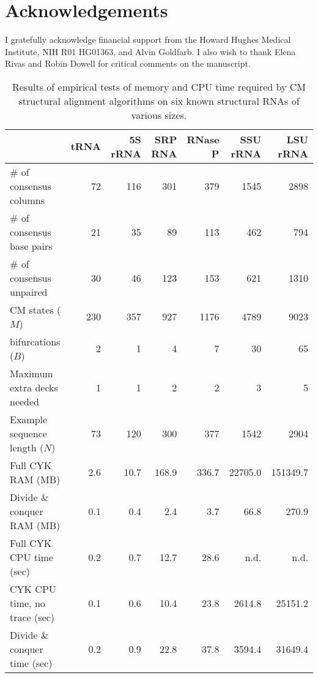 \documentclass[11pt]{article}
\newif\ifdraft
\begin{document}
\section{Acknowledgements}

I gratefully acknowledge financial support from the Howard Hughes
Medical Institute, NIH R01 HG01363, and Alvin Goldfarb. I also wish to
thank Elena Rivas and Robin Dowell for critical comments on the
manuscript.

\newpage


\ifdraft
 \relax
\else
\newpage
\begin{table}[h]
\begin{tabular}{lrrrrrr} 
                             & tRNA&5S rRNA& SRP RNA&RNase P& SSU rRNA& LSU rRNA \\\hline
\# of consensus columns      &  72 &  116 &   301 &   379 &   1545 &    2898\\ 
\# of consensus base pairs   &  21 &   35 &    89 &   113 &    462 &     794\\ 
\# of consensus unpaired     &  30 &   46 &   123 &   153 &    621 &    1310\\ 
CM states ($M$)              & 230 &  357 &   927 &  1176 &   4789 &    9023\\ 
bifurcations ($B$)           &   2 &    1 &     4 &     7 &     30 &      65\\ 
Maximum extra decks needed   &   1 &    1 &     2 &     2 &      3 &       5\\ 
Example sequence length ($N$)&  73 &  120 &   300 &   377 &   1542 &    2904\\
Full CYK RAM (MB)            & 2.6 & 10.7 & 168.9 & 336.7 &22705.0 &151349.7\\
Divide \& conquer RAM (MB)   & 0.1 &  0.4 &   2.4 &   3.7 &   66.8 &   270.9\\ 
Full CYK CPU time (sec)      & 0.2 &  0.7 &  12.7 &  28.6 &   n.d. &    n.d.\\ 
CYK CPU time, no trace (sec) & 0.1 &  0.6 &  10.4 &  23.8 & 2614.8 & 25151.2\\
Divide \& conquer time (sec) & 0.2 &  0.9 &  22.8 &  37.8 & 3594.4 & 31649.4\\\hline
\end{tabular}
\caption{Results of empirical tests of memory and CPU time required by
CM structural alignment algorithms on six known structural RNAs of
various sizes.}
\label{tbl:results}
\end{table}
\end{document}

